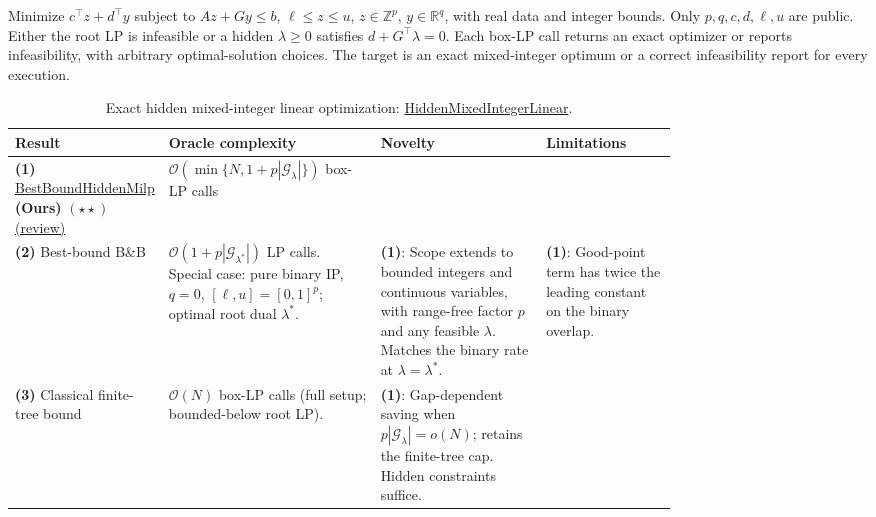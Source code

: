 \begin{table}[tp]
\centering
\caption{Exact hidden mixed-integer linear optimization: \href{https://github.com/k3nfalt/longtails/blob/main/LongTails/Setups/HiddenMixedIntegerLinear.lean}{HiddenMixedIntegerLinear}.}\label{tab:HiddenMixedIntegerLinear}
\parbox{\linewidth}{\footnotesize Minimize $c^\top z+d^\top y$ subject to $Az+Gy\le b$, $\ell\le z\le u$, $z\in\mathbb Z^p$, $y\in\mathbb R^q$, with real data and integer bounds. Only $p,q,c,d,\ell,u$ are public. Either the root LP is infeasible or a hidden $\lambda\ge0$ satisfies $d+G^\top\lambda=0$. Each box-LP call returns an exact optimizer or reports infeasibility, with arbitrary optimal-solution choices. The target is an exact mixed-integer optimum or a correct infeasibility report for every execution.}\par\smallskip
\begin{threeparttable}
\footnotesize
\setlength{\tabcolsep}{4pt}\renewcommand{\arraystretch}{1.25}
\begin{tabularx}{\linewidth}{@{}>{\raggedright\arraybackslash}p{0.20\linewidth}>{\raggedright\arraybackslash}p{0.32\linewidth}>{\raggedright\arraybackslash}p{0.25\linewidth}>{\raggedright\arraybackslash}X@{}}
\toprule
\textbf{Result} & \textbf{Oracle complexity} & \textbf{Novelty} & \textbf{Limitations} \\
\midrule
\textbf{(1)} \href{https://github.com/k3nfalt/longtails/blob/main/LongTails/Theorems/BestBoundHiddenMilp.lean}{Best\allowbreak Bound\allowbreak Hidden\allowbreak Milp} \textbf{(Ours)} $(\star\star)$ \href{https://github.com/k3nfalt/longtails/blob/main/scripts/reviews/BestBoundHiddenMilp.md}{(review)} & $\mathcal{O}\!\left(\min\{N,1+p|\mathcal G_\lambda|\}\right)$ box-LP calls & & \\
\midrule[1.2pt]
\textbf{(2)} Best-bound B\&B \citep[Theorem 3]{hmiDDM2021v4} & $\mathcal{O}(1+p|\mathcal G_{\lambda^*}|)$ LP calls. Special case: pure binary IP, $q=0$, $[\ell,u]=[0,1]^p$; optimal root dual $\lambda^*$. & \textbf{(1)}: Scope extends to bounded integers and continuous variables, with range-free factor $p$ and any feasible $\lambda$. Matches the binary rate at $\lambda=\lambda^*$. & \textbf{(1)}: Good-point term has twice the leading constant on the binary overlap. \\
\midrule
\textbf{(3)} Classical finite-tree bound \citep{hmiRepositoryLp} & $\mathcal{O}(N)$ box-LP calls (full setup; bounded-below root LP). & \textbf{(1)}: Gap-dependent saving when $p|\mathcal G_\lambda|=o(N)$; retains the finite-tree cap. Hidden constraints suffice. & \\

\end{tabularx}
\end{threeparttable}
\end{table}
